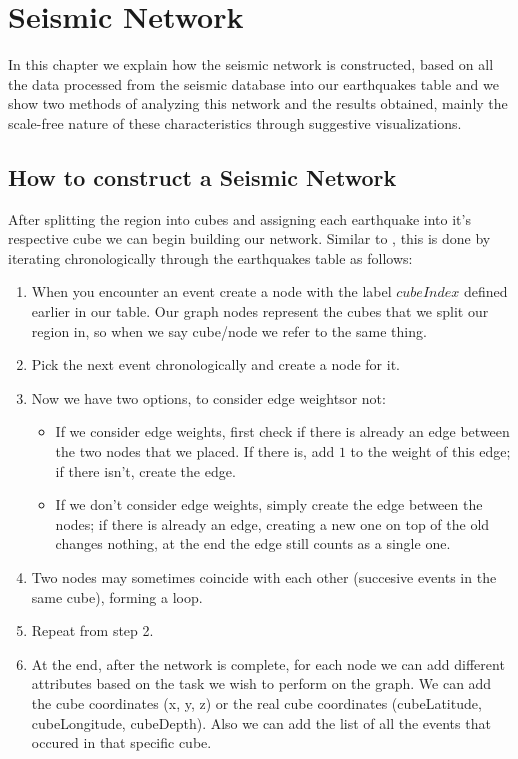 \chapter{Seismic Network}
\label{chap:quakeNetwork}
In this chapter we explain how the seismic network is constructed, based on all the data processed from the seismic database into our earthquakes table and we show two methods of analyzing this network and the results obtained, mainly the scale-free nature of these characteristics through suggestive visualizations.


\section{How to construct a Seismic Network}
\label{subsection:seismicNetwork}
After splitting the region into cubes and assigning each earthquake into it's respective cube we can begin building our network. Similar to \cite{Abe_2004}, this is done by iterating chronologically through the earthquakes table as follows:
\begin{enumerate}
	\item When you encounter an event create a node with the label $cubeIndex$ defined earlier in our table. Our graph nodes represent the cubes that we split our region in, so when we say cube/node we refer to the same thing.
	\item Pick the next event chronologically and create a node for it.
	\item Now we have two options, to consider edge weights\footnotemark or not:
	\begin{itemize}
		\item If we consider edge weights, first check if there is already an edge between the two nodes that we placed. If there is, add $1$ to the weight of this edge; if there isn't, create the edge.
		\item If we don't consider edge weights, simply create the edge between the nodes; if there is already an edge, creating a new one on top of the old changes nothing, at the end the edge still counts as a single one.
	\end{itemize}
	\item Two nodes may sometimes coincide with each other (succesive events in the same cube), forming a loop.
	\item Repeat from step 2.
	\item At the end, after the network is complete, for each node we can add different attributes based on the task we wish to perform on the graph. We can add the cube coordinates (x, y, z) or the real cube coordinates (cubeLatitude, cubeLongitude, cubeDepth). Also we can add the list of all the events that occured in that specific cube.
	
	

\end{enumerate}

